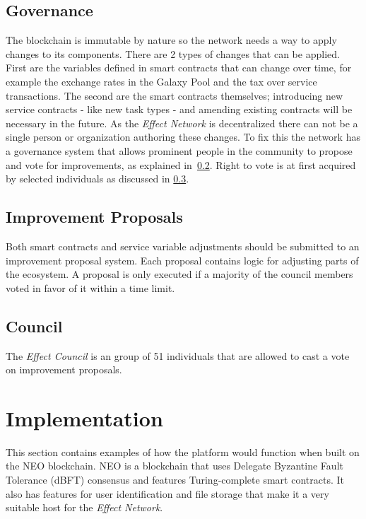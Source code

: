 \documentclass{article}
\begin{document}
\subsection{Governance}
\label{sec:governance}

The blockchain is immutable by nature so the network needs a way to
apply changes to its components. There are 2 types of changes that can
be applied. First are the variables defined in smart contracts that
can change over time, for example the exchange rates in the Galaxy
Pool and the tax over service transactions. The second are the smart
contracts themselves; introducing new service contracts - like new
task types - and amending existing contracts will be necessary in the 
future. As the \emph{Effect Network} is 
decentralized there can not be a single person or organization 
authoring  these changes. To fix this the network has a governance 
system that allows prominent people in the community to propose and
vote for improvements, as explained in~\ref{subsec:improvments}. Right 
to vote is at first acquired by selected individuals as discussed in
\ref{subsec:counsel}.

\subsection{Improvement Proposals}
\label{subsec:improvments}
Both smart contracts and service variable adjustments should be submitted 
to an improvement proposal system. Each proposal contains logic for adjusting 
parts of the ecosystem. A proposal is only executed if a majority of the
council members voted in favor of it within a time limit.

\subsection{Council}
\label{subsec:counsel}
The \emph{Effect Council} is an group of 51 individuals that are allowed to 
cast a vote on improvement proposals.

\section{Implementation}

This section contains examples of how the platform would function when
built on the NEO blockchain. NEO is a blockchain that uses Delegate
Byzantine Fault Tolerance (dBFT) consensus and features Turing-complete smart
contracts. It also has features for user identification and file
storage that make it a very suitable host for the \emph{Effect
  Network}.
\end{document}
